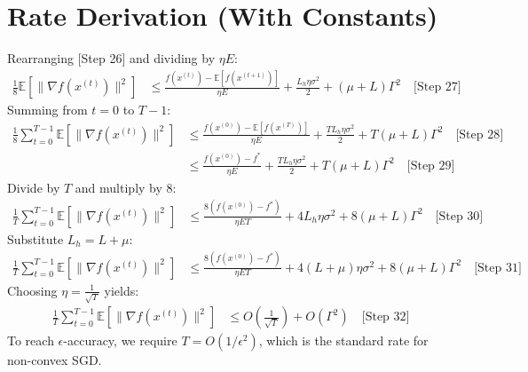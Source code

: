 \documentclass{article}
\begin{document}
\section*{Rate Derivation (With Constants)}
Rearranging [Step 26] and dividing by $\eta E$:
\begin{align*}
\frac{1}{8} \mathbb{E}[\|\nabla f(x^{(t)})\|^2] &\leq \frac{f(x^{(t)}) - \mathbb{E}[f(x^{(t+1)})]}{\eta E} + \frac{L_h \eta \sigma^2}{2} + (\mu + L) \Gamma^2 \quad \text{[Step 27]}
\end{align*}
Summing from $t=0$ to $T-1$:
\begin{align*}
\frac{1}{8} \sum_{t=0}^{T-1} \mathbb{E}[\|\nabla f(x^{(t)})\|^2] &\leq \frac{f(x^{(0)}) - \mathbb{E}[f(x^{(T)})]}{\eta E} + \frac{T L_h \eta \sigma^2}{2} + T (\mu + L) \Gamma^2 \quad \text{[Step 28]} \\
&\leq \frac{f(x^{(0)}) - f^*}{\eta E} + \frac{T L_h \eta \sigma^2}{2} + T (\mu + L) \Gamma^2 \quad \text{[Step 29]}
\end{align*}
Divide by $T$ and multiply by 8:
\begin{align*}
\frac{1}{T} \sum_{t=0}^{T-1} \mathbb{E}[\|\nabla f(x^{(t)})\|^2] &\leq \frac{8(f(x^{(0)}) - f^*)}{\eta E T} + 4L_h \eta \sigma^2 + 8(\mu + L) \Gamma^2 \quad \text{[Step 30]}
\end{align*}
Substitute $L_h = L + \mu$:
\begin{align*}
\frac{1}{T} \sum_{t=0}^{T-1} \mathbb{E}[\|\nabla f(x^{(t)})\|^2] &\leq \frac{8(f(x^{(0)}) - f^*)}{\eta E T} + 4(L+\mu) \eta \sigma^2 + 8(\mu + L) \Gamma^2 \quad \text{[Step 31]}
\end{align*}
Choosing $\eta = \frac{1}{\sqrt{T}}$ yields:
\begin{align*}
\frac{1}{T} \sum_{t=0}^{T-1} \mathbb{E}[\|\nabla f(x^{(t)})\|^2] &\leq O\left(\frac{1}{\sqrt{T}}\right) + O(\Gamma^2) \quad \text{[Step 32]}
\end{align*}
To reach $\epsilon$-accuracy, we require $T = O(1/\epsilon^2)$, which is the standard rate for non-convex SGD.
\end{document}
